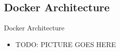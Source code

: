 \documentclass[aspectratio=169]{beamer}
\begin{document}
    \subsection{Docker Architecture}\label{subsec:docker-architecture}
    \begin{frame}{Docker Architecture}
        \begin{itemize}[<+- | alert@+>]
            \item TODO: PICTURE GOES HERE
        \end{itemize}
    \end{frame}
\end{document}
